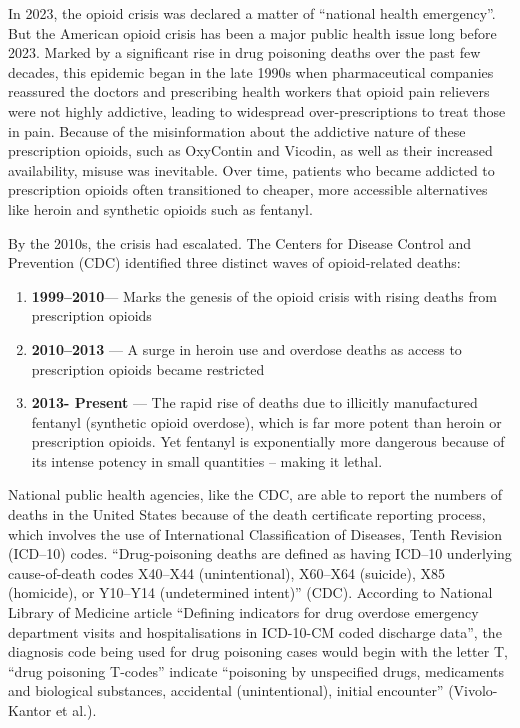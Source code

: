\documentclass[
]{article}
\providecommand{\tightlist}{%
  \setlength{\itemsep}{0pt}\setlength{\parskip}{0pt}}
\begin{document}
In 2023, the opioid crisis was declared a matter of ``national health
emergency''. But the American opioid crisis has been a major public
health issue long before 2023. Marked by a significant rise in drug
poisoning deaths over the past few decades, this epidemic began in the
late 1990s when pharmaceutical companies reassured the doctors and
prescribing health workers that opioid pain relievers were not highly
addictive, leading to widespread over-prescriptions to treat those in
pain. Because of the misinformation about the addictive nature of these
prescription opioids, such as OxyContin and Vicodin, as well as their
increased availability, misuse was inevitable. Over time, patients who
became addicted to prescription opioids often transitioned to cheaper,
more accessible alternatives like heroin and synthetic opioids such as
fentanyl.

By the 2010s, the crisis had escalated. The Centers for Disease Control
and Prevention (CDC) identified three distinct waves of opioid-related
deaths:

\begin{enumerate}
\def\labelenumi{\arabic{enumi}.}
\tightlist
\item
  \textbf{1999--2010}--- Marks the genesis of the opioid crisis with
  rising deaths from prescription opioids
\item
  \textbf{2010--2013} --- A surge in heroin use and overdose deaths as
  access to prescription opioids became restricted
\item
  \textbf{2013- Present} --- The rapid rise of deaths due to illicitly
  manufactured fentanyl (synthetic opioid overdose), which is far more
  potent than heroin or prescription opioids. Yet fentanyl is
  exponentially more dangerous because of its intense potency in small
  quantities -- making it lethal.
\end{enumerate}

National public health agencies, like the CDC, are able to report the
numbers of deaths in the United States because of the death certificate
reporting process, which involves the use of International
Classification of Diseases, Tenth Revision (ICD--10) codes.
``Drug-poisoning deaths are defined as having ICD--10 underlying
cause-of-death codes X40--X44 (unintentional), X60--X64 (suicide), X85
(homicide), or Y10--Y14 (undetermined intent)'' (CDC). According to
National Library of Medicine article ``Defining indicators for drug
overdose emergency department visits and hospitalisations in ICD-10-CM
coded discharge data'', the diagnosis code being used for drug poisoning
cases would begin with the letter T, ``drug poisoning T-codes'' indicate
``poisoning by unspecified drugs, medicaments and biological substances,
accidental (unintentional), initial encounter'' (Vivolo-Kantor et al.).
\end{document}
